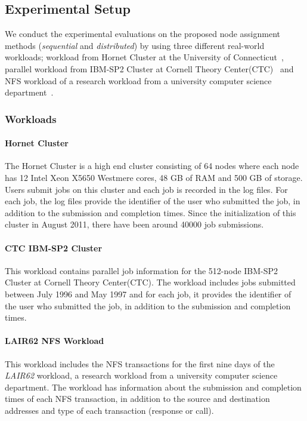 \label{setup}
\subsection{Experimental Setup}
We conduct the experimental evaluations on the proposed node assignment methods
(\emph{sequential} and \emph{distributed}) by using three different real-world
workloads; workload from Hornet Cluster at the University of Connecticut~\cite{hornet},
parallel workload from IBM-SP2 Cluster at Cornell Theory Center(CTC)~\cite{ctcsp2} and NFS
workload of a research workload from a university computer science department~\cite{lair62}.

\subsubsection{Workloads}
\paragraph{Hornet Cluster}
The Hornet Cluster is a high end cluster consisting of 64 nodes where each node has 12 Intel Xeon X5650
Westmere cores, 48 GB of RAM and 500 GB of storage. Users submit jobs on this cluster and
each job is recorded in the log files. For each job, the log files provide the identifier of the
user who submitted the job, in addition to the submission and completion times. Since the
initialization of this cluster in August 2011, there have been around 40000 job submissions.

\paragraph{CTC IBM-SP2 Cluster}
This workload contains parallel job information for the 512-node IBM-SP2 Cluster at Cornell
Theory Center(CTC). The workload includes jobs submitted between July 1996 and May 1997 and
for each job, it provides the identifier of the user who submitted the job, in addition to the
submission and completion times.

\paragraph{LAIR62 NFS Workload}
This workload includes the NFS transactions for the first nine days of the \textit{LAIR62} workload,
a research workload from a university computer science department. The workload has information
about the submission and completion times of each NFS transaction, in addition to the source and
destination addresses and type of each transaction (response or call). 

